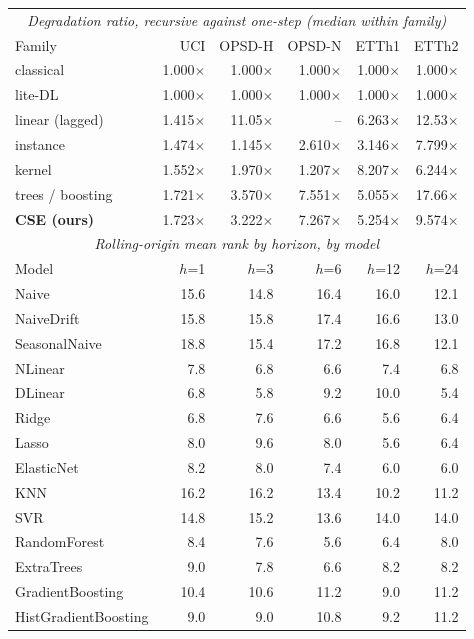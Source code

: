 \begin{tabular}{lrrrrr}
\toprule
\multicolumn{6}{c}{\emph{Degradation ratio, recursive against one-step (median within family)}} \\
Family & UCI & OPSD-H & OPSD-N & ETTh1 & ETTh2 \\
\midrule
classical & 1.000$\times$ & 1.000$\times$ & 1.000$\times$ & 1.000$\times$ & 1.000$\times$ \\
lite-DL & 1.000$\times$ & 1.000$\times$ & 1.000$\times$ & 1.000$\times$ & 1.000$\times$ \\
linear (lagged) & 1.415$\times$ & 11.05$\times$ & -- & 6.263$\times$ & 12.53$\times$ \\
instance & 1.474$\times$ & 1.145$\times$ & 2.610$\times$ & 3.146$\times$ & 7.799$\times$ \\
kernel & 1.552$\times$ & 1.970$\times$ & 1.207$\times$ & 8.207$\times$ & 6.244$\times$ \\
trees / boosting & 1.721$\times$ & 3.570$\times$ & 7.551$\times$ & 5.055$\times$ & 17.66$\times$ \\
\textbf{CSE (ours)} & 1.723$\times$ & 3.222$\times$ & 7.267$\times$ & 5.254$\times$ & 9.574$\times$ \\
\midrule
\multicolumn{6}{c}{\emph{Rolling-origin mean rank by horizon, by model}} \\
Model & $h$=1 & $h$=3 & $h$=6 & $h$=12 & $h$=24 \\
\midrule
Naive & 15.6 & 14.8 & 16.4 & 16.0 & 12.1 \\
NaiveDrift & 15.8 & 15.8 & 17.4 & 16.6 & 13.0 \\
SeasonalNaive & 18.8 & 15.4 & 17.2 & 16.8 & 12.1 \\
NLinear & 7.8 & 6.8 & 6.6 & 7.4 & 6.8 \\
DLinear & 6.8 & 5.8 & 9.2 & 10.0 & 5.4 \\
Ridge & 6.8 & 7.6 & 6.6 & 5.6 & 6.4 \\
Lasso & 8.0 & 9.6 & 8.0 & 5.6 & 6.4 \\
ElasticNet & 8.2 & 8.0 & 7.4 & 6.0 & 6.0 \\
KNN & 16.2 & 16.2 & 13.4 & 10.2 & 11.2 \\
SVR & 14.8 & 15.2 & 13.6 & 14.0 & 14.0 \\
RandomForest & 8.4 & 7.6 & 5.6 & 6.4 & 8.0 \\
ExtraTrees & 9.0 & 7.8 & 6.6 & 8.2 & 8.2 \\
GradientBoosting & 10.4 & 10.6 & 11.2 & 9.0 & 11.2 \\
HistGradientBoosting & 9.0 & 9.0 & 10.8 & 9.2 & 11.2 \\

\end{tabular}
